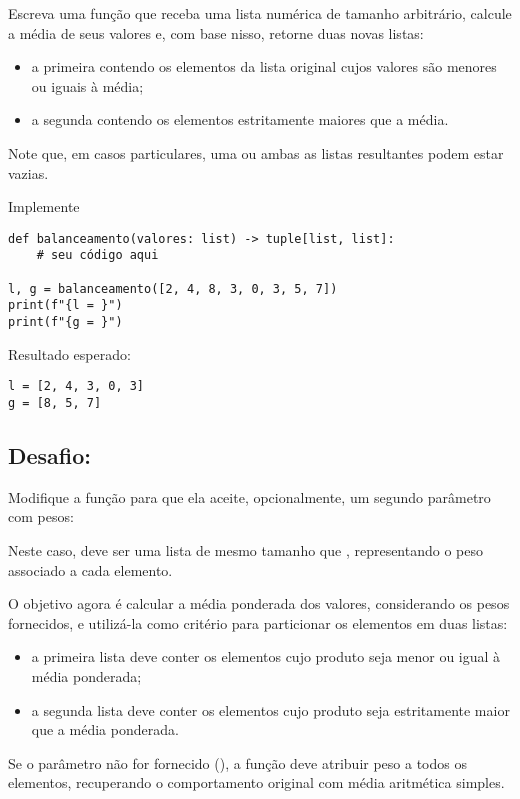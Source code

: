 Escreva uma função  que receba uma lista numérica de
tamanho arbitrário, calcule a média de seus valores e, com base nisso, retorne duas novas listas:
\begin{itemize}
    \item a primeira contendo os elementos da lista original cujos valores são menores ou iguais à média;
    \item a segunda contendo os elementos estritamente maiores que a média.
\end{itemize}

Note que, em casos particulares, uma ou ambas as listas resultantes podem estar vazias.

Implemente
\begin{verbatim}
def balanceamento(valores: list) -> tuple[list, list]:
    # seu código aqui

l, g = balanceamento([2, 4, 8, 3, 0, 3, 5, 7])
print(f"{l = }")
print(f"{g = }")
\end{verbatim}

Resultado esperado:
\begin{verbatim}
l = [2, 4, 3, 0, 3]
g = [8, 5, 7]
\end{verbatim}

\subsection*{Desafio:}
Modifique a função para que ela aceite, opcionalmente, um segundo parâmetro com pesos:

Neste caso,  deve ser uma lista de mesmo tamanho que , representando o peso associado
a cada elemento.

O objetivo agora é calcular a média ponderada dos valores, considerando os pesos fornecidos, e utilizá-la como
critério para particionar os elementos em duas listas:
\begin{itemize}
    \item a primeira lista deve conter os elementos cujo produto  seja menor ou igual à
    média ponderada;
    \item a segunda lista deve conter os elementos cujo produto  seja estritamente maior que a
    média ponderada.
\end{itemize}

Se o parâmetro  não for fornecido (), a função deve atribuir peso  a todos
os elementos, recuperando o comportamento original com média aritmética simples.


